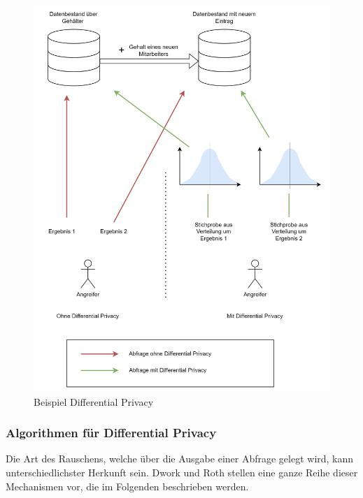 \begin{figure}[!htb]
    \centering
    \includegraphics[width=\textwidth]{figures/dp}
    \caption{Beispiel Differential Privacy}
    \label{fig:dp}
\end{figure} 

\subsubsection*{Algorithmen für Differential Privacy}
Die Art des Rauschens, welche über die Ausgabe einer Abfrage gelegt wird, kann unterschiedlichster Herkunft sein.
Dwork und Roth \cite{P-27} stellen eine ganze Reihe dieser Mechanismen vor, die im Folgenden beschrieben werden.

